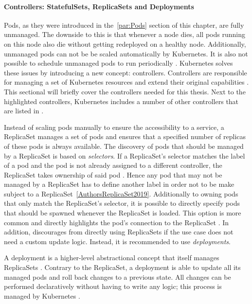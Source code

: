 \paragraph{Controllers: StatefulSets, ReplicaSets and Deployments}%
\label{par:Controllers}
Pods, as they were introduced in the~\ref{par:Pods} section of this chapter,
are fully unmanaged. The downside to this is that whenever a node dies, all
pods running on this node also die without getting redeployed on a healthy
node. Additionally, unmanaged pods can not be be scaled automatically by
Kubernetes. It is also not possible to schedule unmanaged pods to run
periodically \autocite[Ch. 4]{LuksaKubernetesAction2017}. Kubernetes solves
these issues by introducing a new concept: controllers. Controllers are
responsible for managing a set of Kubernetes resources and extend their
original capabilities \autocite{AuthorsConcepts2019}. This sectional will
briefly cover the controllers needed for this thesis. Next to the highlighted
controllers, Kubernetes includes a number of other controllers that are listed
in \autocite{AuthorsConcepts2019}.

Instead of scaling pods manually to ensure the accessibility to a service, a
ReplicaSet manages a set of pods and ensures that a specified number of
replicas of these pods is always available. The discovery of pods that should
be managed by a ReplicaSet is based on \textit{selectors}. If a ReplicaSet's
selector matches the label of a pod and the pod is not already assigned to a
different controller, the ReplicaSet takes ownership of said pod \autocite[Ch.
4]{LuksaKubernetesAction2017}. Hence any pod that may not be managed by a
ReplicaSet has to define another label in order not to be make subject to a
ReplicaSet~\ref{AuthorsReplicaSet2019}. Additionally to owning pods that only
match the ReplicaSet's selector, it is possible to directly specify pods that
should be spawned whenever the ReplicaSet is loaded. This option is more common
and directly highlights the pod's connection to the ReplicaSet
\autocite{AuthorsReplicaSet2019}. In addition, \autocite{AuthorsReplicaSet2019}
discourages from directly using ReplicaSets if the use case does not need a
custom update logic. Instead, it is recommended to use \textit{deployments}.

A deployment is a higher-level abstractional concept that itself manages
ReplicaSets \autocite{AuthorsReplicaSet2019}. Contrary to the ReplicaSet, a
deployment is able to update all its managed pods and roll back changes to a
previous state. All changes can be performed declaratively without having to
write any logic; this process is managed by Kubernetes \autocite[Ch.
9]{LuksaKubernetesAction2017}.

